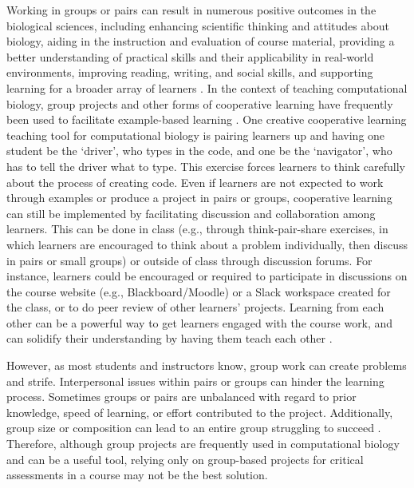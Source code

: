 Working in groups or pairs can result in numerous positive outcomes in the biological sciences, including enhancing scientific thinking and attitudes about biology, aiding in the instruction and evaluation of course material, providing a better understanding of practical skills and their applicability in real-world environments, improving reading, writing, and social skills, and supporting learning for a broader array of learners \citep[reviewed in][]{lord_101_2001}. %
In the context of teaching computational biology, group projects and other forms of cooperative learning have frequently been used to facilitate example-based learning  \citep[e.g.,][]{emery_application_2017,korcsmaros_teaching_2013,fuselier_trace_2011}.
One creative cooperative learning teaching tool for computational biology is pairing learners up and having one student be the `driver', who types in the code, and one be the `navigator', who has to tell the driver what to type. 
This exercise forces learners to think carefully about the process of creating code.
Even if learners are not expected to work through examples or produce a project in pairs or groups, cooperative learning can still be implemented by facilitating discussion and collaboration among learners.
This can be done in class (e.g., through think-pair-share exercises, in which learners are encouraged to think about a problem individually, then discuss in pairs or small groups) or outside of class through discussion forums.
For instance, learners could be encouraged or required to participate in discussions on the course website (e.g., Blackboard/Moodle) or a Slack workspace created for the class, or to do peer review of other learners' projects. 
Learning from each other can be a powerful way to get learners engaged with the course work, and can solidify their understanding by having them teach each other \citep{treisman1992studying}.

However, as most students and instructors know, group work can create problems and strife.
Interpersonal issues within pairs or groups can hinder the learning process.
Sometimes groups or pairs are unbalanced with regard to prior knowledge, speed of learning, or effort contributed to the project.
Additionally, group size or composition can lead to an entire group struggling to succeed \citep[e.g.,][]{compeau_establishing_2019}. 
Therefore, although group projects are frequently used in computational biology and can be a useful tool, relying only on group-based projects for critical assessments in a course may not be the best solution.

